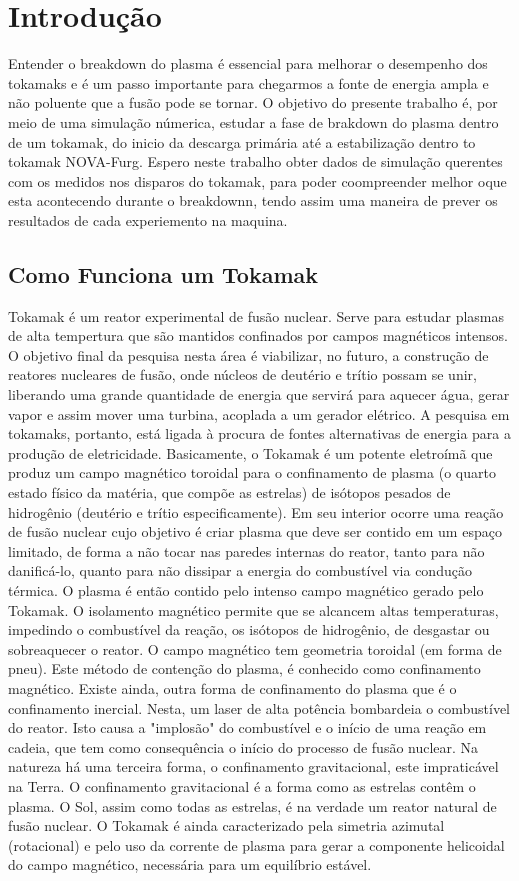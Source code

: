 \documentclass[12pt,oneside,a4paper]{abntex2}
\theoremstyle{definition}  %
\begin{document}
\chapter*[Introdução]{Introdução}
Entender o breakdown do plasma é essencial para melhorar o desempenho dos tokamaks e é um passo importante para chegarmos a fonte de energia ampla e não poluente que a fusão pode se tornar.
O objetivo do presente trabalho é, por meio de uma simulação númerica, estudar  a fase de brakdown do plasma dentro de um tokamak, do inicio da descarga primária até a estabilização dentro to tokamak NOVA-Furg. Espero neste trabalho obter dados de simulação querentes com os medidos nos disparos do tokamak, para poder coompreender melhor oque esta acontecendo durante o breakdownn, tendo assim uma maneira de prever os resultados de cada experiemento na maquina.
\section{Como Funciona um Tokamak}
Tokamak é um reator experimental de fusão nuclear. Serve para estudar plasmas de alta tempertura que são mantidos confinados por campos magnéticos intensos. O objetivo final da pesquisa nesta área é viabilizar, no futuro, a construção de reatores nucleares de fusão, onde núcleos de deutério e trítio possam se unir, liberando uma grande quantidade de energia que servirá para aquecer água, gerar vapor e assim mover uma turbina, acoplada a um gerador elétrico. A pesquisa em tokamaks, portanto, está ligada à procura de fontes alternativas de energia para a produção de eletricidade. 
Basicamente, o Tokamak é um potente eletroímã que produz um campo magnético toroidal para o confinamento de plasma (o quarto estado físico da matéria, que compõe as estrelas) de isótopos pesados de hidrogênio (deutério e trítio especificamente). Em seu interior ocorre uma reação de fusão nuclear cujo objetivo é criar plasma que deve ser contido em um espaço limitado, de forma a não tocar nas paredes internas do reator, tanto para não danificá-lo, quanto para não dissipar a energia do combustível via condução térmica. O plasma é então contido pelo intenso campo magnético gerado pelo Tokamak.
O isolamento magnético permite que se alcancem altas temperaturas, impedindo o combustível da reação, os isótopos de hidrogênio, de desgastar ou sobreaquecer o reator. O campo magnético tem geometria toroidal (em forma de pneu). Este método de contenção do plasma, é conhecido como confinamento magnético. Existe ainda, outra forma de confinamento do plasma que é o confinamento inercial. Nesta, um laser de alta potência bombardeia o combustível do reator. Isto causa a "implosão" do combustível e o início de uma reação em cadeia, que tem como consequência o início do processo de fusão nuclear. Na natureza há uma terceira forma, o confinamento gravitacional, este impraticável na Terra. O confinamento gravitacional é a forma como as estrelas contêm o plasma. O Sol, assim como todas as estrelas, é na verdade um reator natural de fusão nuclear. O Tokamak é ainda caracterizado pela simetria azimutal (rotacional) e pelo uso da corrente de plasma para gerar a componente helicoidal do campo magnético, necessária para um equilíbrio estável.
\end{document}
